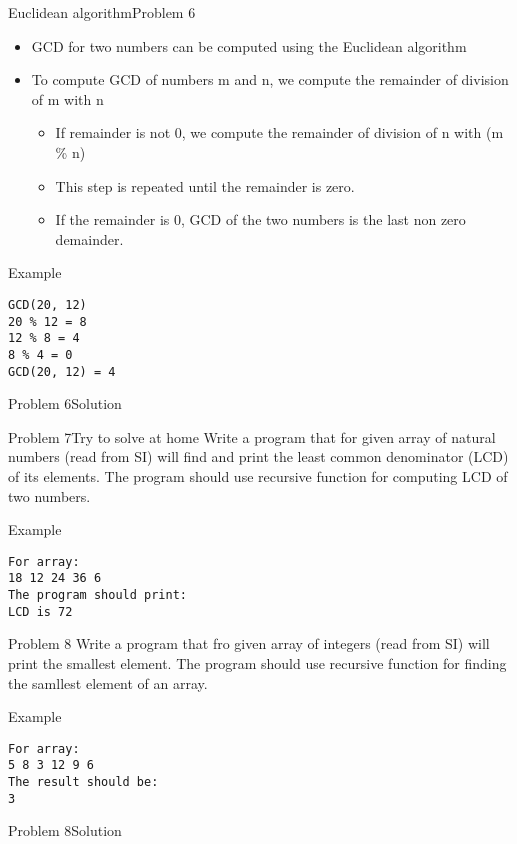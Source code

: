 \begin{frame}[fragile,shrink=5]{Euclidean algorithm}{Problem 6}
\begin{itemize}
  \item GCD for two numbers can be computed using the Euclidean algorithm
  \item To compute GCD of numbers m and n, we compute the remainder of
  division of m with n
  \begin{itemize}
  \item If remainder is not 0, we compute the remainder of division of n with (m
  \% n)
  \item This step is repeated until the remainder is zero.
  \item If the remainder is 0, GCD of the two numbers is the last non zero
  demainder.
  \end{itemize}
\end{itemize}
\begin{exampleblock}{Example}
\begin{verbatim}
GCD(20, 12)
20 % 12 = 8
12 % 8 = 4
8 % 4 = 0
GCD(20, 12) = 4
\end{verbatim}
\end{exampleblock}
\end{frame}

\begin{frame}[fragile]{Problem 6}{Solution}

\end{frame}

\begin{frame}[fragile]{Problem 7}{Try to solve at home}
Write a program that for given array of natural numbers (read from SI) will find
and print the least common denominator (LCD) of its elements. The program should
use recursive function for computing LCD of two numbers.
\begin{exampleblock}{Example}
\begin{verbatim}
For array:
18 12 24 36 6
The program should print:
LCD is 72
\end{verbatim}
\end{exampleblock}
\end{frame}
   

\begin{frame}[fragile]{Problem 8}
Write a program that fro given array of integers (read from SI) will print the
smallest element. The program should use recursive function for finding the
samllest element of an array.
\begin{exampleblock}{Example}
\begin{verbatim}
For array:
5 8 3 12 9 6
The result should be:
3
\end{verbatim}
\end{exampleblock}
\end{frame}

\begin{frame}[fragile]{Problem 8}{Solution}

\end{frame}

